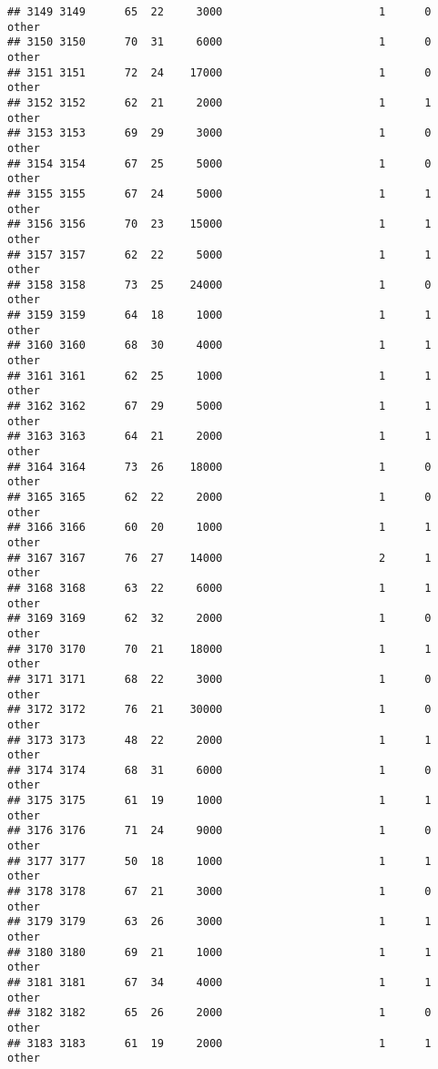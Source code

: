 \documentclass[
]{article}
\begin{document}
\begin{verbatim}
## 3149 3149      65  22     3000                        1      0    other
## 3150 3150      70  31     6000                        1      0    other
## 3151 3151      72  24    17000                        1      0    other
## 3152 3152      62  21     2000                        1      1    other
## 3153 3153      69  29     3000                        1      0    other
## 3154 3154      67  25     5000                        1      0    other
## 3155 3155      67  24     5000                        1      1    other
## 3156 3156      70  23    15000                        1      1    other
## 3157 3157      62  22     5000                        1      1    other
## 3158 3158      73  25    24000                        1      0    other
## 3159 3159      64  18     1000                        1      1    other
## 3160 3160      68  30     4000                        1      1    other
## 3161 3161      62  25     1000                        1      1    other
## 3162 3162      67  29     5000                        1      1    other
## 3163 3163      64  21     2000                        1      1    other
## 3164 3164      73  26    18000                        1      0    other
## 3165 3165      62  22     2000                        1      0    other
## 3166 3166      60  20     1000                        1      1    other
## 3167 3167      76  27    14000                        2      1    other
## 3168 3168      63  22     6000                        1      1    other
## 3169 3169      62  32     2000                        1      0    other
## 3170 3170      70  21    18000                        1      1    other
## 3171 3171      68  22     3000                        1      0    other
## 3172 3172      76  21    30000                        1      0    other
## 3173 3173      48  22     2000                        1      1    other
## 3174 3174      68  31     6000                        1      0    other
## 3175 3175      61  19     1000                        1      1    other
## 3176 3176      71  24     9000                        1      0    other
## 3177 3177      50  18     1000                        1      1    other
## 3178 3178      67  21     3000                        1      0    other
## 3179 3179      63  26     3000                        1      1    other
## 3180 3180      69  21     1000                        1      1    other
## 3181 3181      67  34     4000                        1      1    other
## 3182 3182      65  26     2000                        1      0    other
## 3183 3183      61  19     2000                        1      1    other

\end{verbatim}
\end{document}
